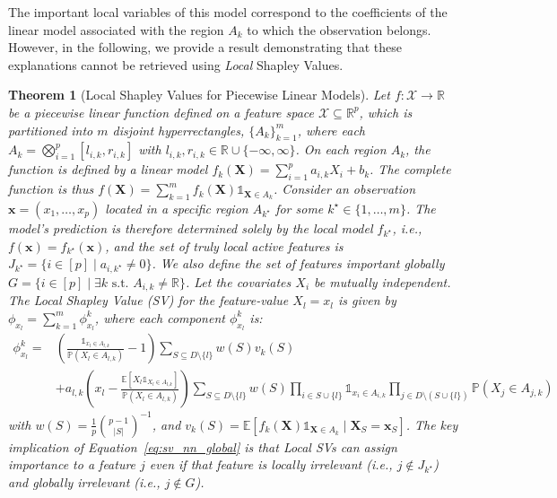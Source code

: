 \documentclass{article}
\theoremstyle{plain}
\newtheorem{theorem}{Theorem}[section]
\theoremstyle{definition}
\theoremstyle{remark}
\begin{document}




The important local variables of this model correspond to the coefficients of the linear model associated with the region $A_k$ to which the observation belongs. However, in the following, we provide a result demonstrating that these explanations cannot be retrieved using \textit{Local} Shapley Values.




\begin{theorem}[Local Shapley Values for Piecewise Linear Models]
\label{theo:sv_impossible}
Let $f: \mathcal{X} \to \mathbb{R}$ be a piecewise linear function defined on a feature space $\mathcal{X} \subseteq \mathbb{R}^p$, which is partitioned into $m$ disjoint hyperrectangles, $\{A_k\}_{k=1}^m$, where each $A_k = \bigotimes_{i=1}^p [l_{i,k}, r_{i,k}]$ with $l_{i,k}, r_{i,k} \in \mathbb{R} \cup \{-\infty, \infty\}$. On each region $A_k$, the function is defined by a linear model $f_k(\mathbf{X}) = \sum_{i=1}^p a_{i,k} X_i + b_k$. The complete function is thus $f(\mathbf{X}) = \sum_{k=1}^m f_k(\mathbf{X}) \mathds{1}_{\mathbf{X} \in A_k}$. Consider an observation $\mathbf{x} = (x_1, \dots, x_p)$ located in a specific region $A_{k^\star}$ for some $k^\star \in \{1, \dots, m\}$. The model's prediction is therefore determined solely by the local model $f_{k^\star}$, i.e., $f(\mathbf{x}) = f_{k^\star}(\mathbf{x})$, and the set of truly local active features is $J_{k^\star} = \{i \in [p] \mid a_{i,k^\star} \neq 0\}$. We also define the set of features important globally $G = \{i \in [p] \mid \exists k \text{ s.t. } A_{i,k} \neq \mathbb{R}\}$. Let the covariates $X_i$ be mutually independent. The Local Shapley Value (SV) for the feature-value $X_l=x_l$ is given by $\phi_{x_l} = \sum_{k=1}^m \phi_{x_l}^k$, where each component $\phi_{x_l}^k$ is:
\begin{equation} \label{eq:sv_nn_global}
\begin{split}
    \phi_{x_l}^k = & \left( \frac{\mathds{1}_{x_l \in A_{l, k}}}{\mathbb{P}(X_l \in A_{l, k})} - 1 \right) \sum_{S \subseteq D\setminus\{l\}} w(S) v_k(S) \\
    & + a_{l, k} \left( x_{l} - \frac{\mathbb{E}\left[ X_l \mathds{1}_{X_l \in A_{l, k}}\right]}{\mathbb{P}(X_l \in A_{l, k})}\right) \sum_{S \subseteq D\setminus\{l\}} w(S) \prod_{i \in S\cup \{l\}} \mathds{1}_{x_i \in A_{i, k}} \prod_{j \in D \setminus (S\cup \{l\})} \mathbb{P}(X_j \in A_{j, k})
\end{split}
\end{equation}
with $w(S)= \frac{1}{p} \binom{p-1}{|S|}^{-1}$, and $v_k(S) = \mathbb{E}[f_k(\mathbf{X})\mathds{1}_{\mathbf{X} \in A_k} \mid \mathbf{X}_S = \mathbf{x}_S]$. The key implication of Equation~\eqref{eq:sv_nn_global} is that Local SVs can assign importance to a feature $j$ even if that feature is locally irrelevant (i.e., $  j\notin J_{k^\star}$) and globally irrelevant (i.e., $  j\notin G$). 
\end{theorem}
\end{document}
